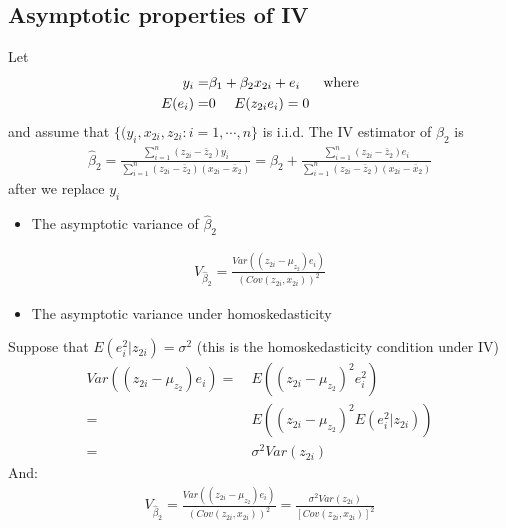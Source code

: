\documentclass[a4paper,twoside,11pt]{article}
\begin{document}
\subsection{Asymptotic properties of IV}
Let
\begin{equation*}
\begin{aligned}
y_i =& \beta_1 + \beta_2 x_{2i} + e_i \ \ \ \ \ \textmd{where} \\
E(e_i) =& 0 \ \ \ \ E(z_{2i} e_i) =0
\end{aligned} 
\end{equation*}
and assume that $\{ (y_i, x_{2i},z_{2i}:i=1,\cdots, n\}$ is i.i.d.
\newline
\newline
The IV estimator of $\beta_2$ is
\begin{equation*}
\begin{aligned}
\hat{\beta}_2 = \frac{\sum^n_{i=1}(z_{2i}-\bar z_2)y_i}{\sum^n_{i=1}(z_{2i}- \bar z_2)(x_{2i}-\bar x_2)} = \beta_2 + \frac{\sum^n_{i=1}(z_{2i}-\bar z_2)e_i}{\sum^n_{i=1}(z_{2i}-\bar z_2)(x_{2i}-\bar x_2)}
\end{aligned} 
\end{equation*}
after we replace $y_i$
\begin{itemize}
    \item The asymptotic variance of $\hat{\beta}_2$
\end{itemize}
\begin{equation*}
\begin{aligned}
V_{\hat{\beta}_2} = \frac{Var((z_{2i}-\mu_{z_2})e_i)}{(Cov(z_{2i},x_{2i}))^2}
\end{aligned} 
\end{equation*}
\begin{itemize}
    \item The asymptotic variance under homoskedasticity
\end{itemize}
Suppose that $E(e_i^2|z_{2i}) = \sigma^2$ (this is the homoskedasticity condition under IV)
\begin{equation*}
\begin{aligned}
Var((z_{2i} - \mu_{z_2} )e_i) =& \ E((z_{2i} - \mu_{z_2})^2 e_i^2) \\
=& \ E((z_{2i}- \mu_{z_2})^2 E(e_i^2 | z_{2i})) \\
=& \ \sigma^2 Var(z_{2i})
\end{aligned} 
\end{equation*}
And:
\begin{equation*}
\begin{aligned}
V_{\hat{\beta}_2} = \frac{Var((z_{2i}-\mu_{z_2})e_i)}{(Cov(z_{2i}, x_{2i}))^2}= \frac{\sigma^2 Var(z_{2i})}{[Cov(z_{2i},x_{2i})]^2}
\end{aligned} 
\end{equation*}
\end{document}
